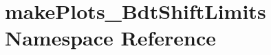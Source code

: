 \hypertarget{namespacemakePlots__BdtShiftLimits}{
\section{makePlots\_\-BdtShiftLimits Namespace Reference}
\label{namespacemakePlots__BdtShiftLimits}
}

